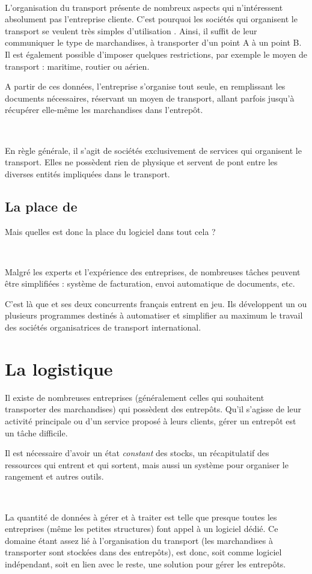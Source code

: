 ~

L'organisation du transport présente de nombreux aspects qui n'intéressent absolument pas l'entreprise cliente. C'est pourquoi les sociétés qui organisent le transport se veulent très simples \og d'utilisation \fg. Ainsi, il suffit de leur communiquer le type de marchandises, à transporter d'un point A à un point B. Il est également possible d'imposer quelques restrictions, par exemple le moyen de transport : maritime, routier ou aérien.

A partir de ces données, l'entreprise s'organise tout seule, en remplissant les documents nécessaires, réservant un moyen de transport, allant parfois jusqu'à récupérer elle-même les marchandises dans l'entrepôt.

~

En règle générale, il s'agit de sociétés exclusivement de services qui organisent le transport. Elles ne possèdent rien de physique et servent de pont entre les diverses entités impliquées dans le transport.


\subsection{La place de \integrale}
Mais quelles est donc la place du logiciel \integrale{} dans tout cela ?

~

Malgré les experts et l'expérience des entreprises, de nombreuses tâches peuvent être simplifiées : système de facturation, envoi automatique de documents, etc.

C'est là que \solulog{} et ses deux concurrents français entrent en jeu. Ils développent un ou plusieurs programmes destinés à automatiser et simplifier au maximum le travail des sociétés organisatrices de transport international.


\section{La logistique}
Il existe de nombreuses entreprises (généralement celles qui souhaitent transporter des marchandises) qui possèdent des entrepôts. Qu'il s'agisse de leur activité principale ou d'un service proposé à leurs clients, gérer un entrepôt est un tâche difficile.

Il est nécessaire d'avoir un état \emph{constant} des stocks, un récapitulatif des ressources qui entrent et qui sortent, mais aussi un système pour organiser le rangement et autres outils.

~

La quantité de données à gérer et à traiter est telle que presque toutes les entreprises (même les petites structures) font appel à un logiciel dédié. Ce domaine étant assez lié à l'organisation du transport (les marchandises à transporter sont stockées dans des entrepôts), \integrale{} est donc, soit comme logiciel indépendant, soit en lien avec le reste, une solution pour gérer les entrepôts.
